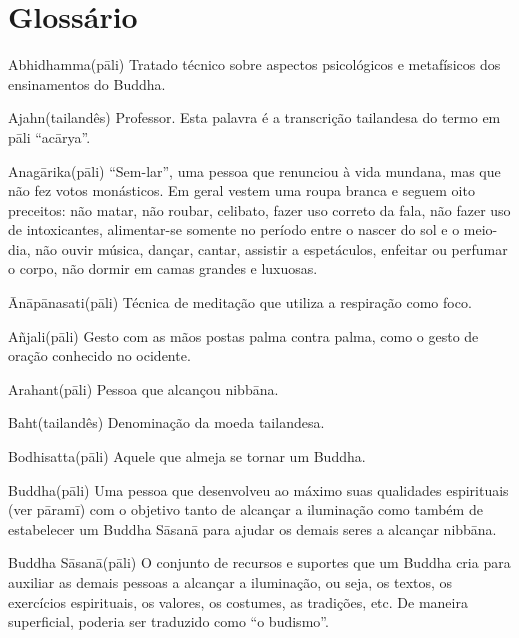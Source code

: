 \chapter{Glossário}

\begin{glossarydescription}

\item[{{Abhidhamma}{(pāli)}}] Tratado técnico sobre aspectos psicológicos e metafísicos dos ensinamentos do Buddha.

\item[{{Ajahn}{(tailandês)}}] Professor. Esta palavra é a transcrição tailandesa do termo em pāli ``acārya''.

\item[{{Anagārika}{(pāli)}}] ``Sem-lar'', uma pessoa que renunciou à vida mundana, mas que não fez votos monásticos. Em geral vestem uma roupa branca e seguem oito preceitos: não matar, não roubar, celibato, fazer uso correto da fala, não fazer uso de intoxicantes, alimentar-se somente no período entre o nascer do sol e o meio-dia, não ouvir música, dançar, cantar, assistir a espetáculos, enfeitar ou perfumar o corpo, não dormir em camas grandes e luxuosas.

\item[{{Ānāpānasati}{(pāli)}}] Técnica de meditação que utiliza a respiração como foco.

\item[{{Añjali}{(pāli)}}] Gesto com as mãos postas palma contra palma, como o gesto de oração conhecido no ocidente.

\item[{{Arahant}{(pāli)}}] Pessoa que alcançou nibbāna.

\item[{{Baht}{(tailandês)}}] Denominação da moeda tailandesa.

\item[{{Bodhisatta}{(pāli)}}] Aquele que almeja se tornar um Buddha.

\item[{{Buddha}{(pāli)}}] Uma pessoa que desenvolveu ao máximo suas qualidades espirituais (ver pāramī) com o objetivo tanto de alcançar a iluminação como também de estabelecer um Buddha Sāsanā para ajudar os demais seres a alcançar nibbāna.

\item[{{Buddha Sāsanā}{(pāli)}}] O conjunto de recursos e suportes que um Buddha cria para auxiliar as demais pessoas a alcançar a iluminação, ou seja, os textos, os exercícios espirituais, os valores, os costumes, as tradições, etc. De maneira superficial, poderia ser traduzido como ``o budismo''.


\end{glossarydescription}
